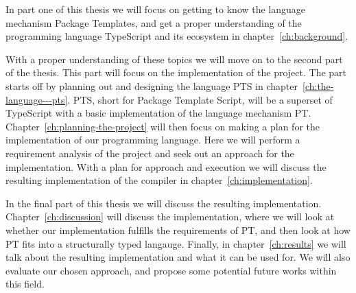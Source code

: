 In part one of this thesis we will focus on getting to know the language mechanism Package Templates, and get a proper understanding of the programming language TypeScript and its ecosystem in chapter~\vref{ch:background}.

With a proper understanding of these topics we will move on to the second part of the thesis.
This part will focus on the implementation of the project.
The part starts off by planning out and designing the language PTS in chapter~\vref{ch:the-language---pts}.
PTS, short for Package Template Script, will be a superset of TypeScript with a basic implementation of the language mechanism PT\@.
Chapter~\vref{ch:planning-the-project} will then focus on making a plan for the implementation of our programming language.
Here we will perform a requirement analysis of the project and seek out an approach for the implementation.
With a plan for approach and execution we will discuss the resulting implementation of the compiler in chapter~\vref{ch:implementation}.

In the final part of this thesis we will discuss the resulting implementation.
Chapter~\vref{ch:discussion} will discuss the implementation, where we will look at whether our implementation fulfills the requirements of PT, and then look at how PT fits into a structurally typed langauge.
Finally, in chapter~\vref{ch:results} we will talk about the resulting implementation and what it can be used for.
We will also evaluate our chosen approach, and propose some potential future works within this field.

